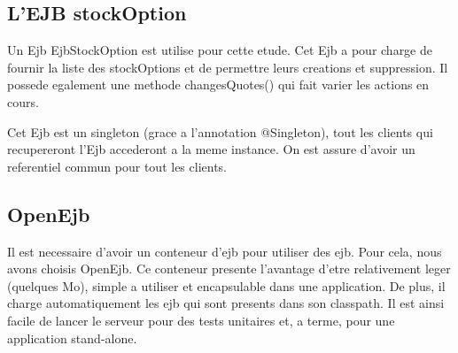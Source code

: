 \subsection{L'EJB stockOption}
Un Ejb EjbStockOption est utilise pour cette etude. Cet Ejb a pour charge de fournir la liste des stockOptions et de permettre leurs creations et suppression. Il possede egalement une methode changesQuotes() qui fait varier les actions en cours. 

Cet Ejb est un singleton (grace a l'annotation @Singleton), tout les clients qui recupereront l'Ejb accederont a la meme instance. On est assure d'avoir un referentiel commun pour tout les clients.
\subsection{OpenEjb}
Il est necessaire d'avoir un conteneur d'ejb pour utiliser des ejb. Pour cela, nous avons choisis OpenEjb. Ce conteneur presente l'avantage d'etre relativement leger (quelques Mo), simple a utiliser et encapsulable dans une application. De plus, il charge automatiquement les ejb qui sont presents dans son classpath. Il est ainsi facile de lancer le serveur pour des tests unitaires et, a terme, pour une application stand-alone. 


